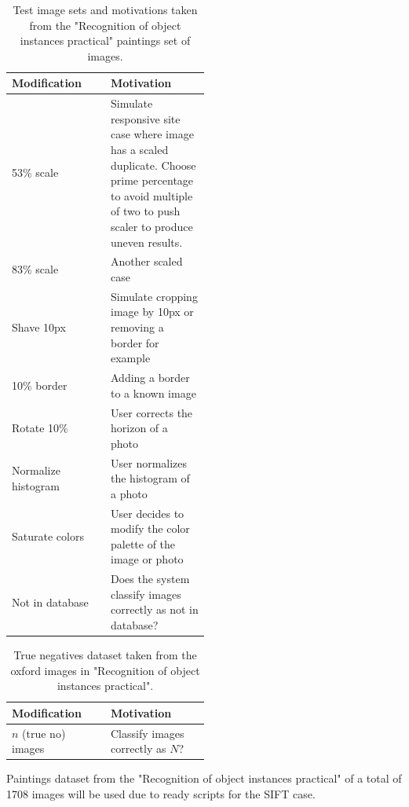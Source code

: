 \documentclass[english,12pt,a4paper,pdftex,elec,utf8]{aaltothesis}
\begin{document}
\def\arraystretch{1.5}
\begin{table}[htb]
\caption{Test image sets and motivations taken from the "Recognition of object instances practical" paintings set of images.}
\label{modifiedimages}
\begin{center}
\begin{tabular}{lp{0.5\linewidth}}
  Modification & Motivation \\
  \hline \hline
  53\% scale& Simulate responsive site case where image has a scaled duplicate. Choose prime percentage to avoid multiple of two to push scaler to produce uneven results.\\
  \hline
  83\% scale& Another scaled case \\
  \hline
  Shave 10px & Simulate cropping image by 10px or removing a border for example\\
  \hline
  10\% border & Adding a border to a known image \\
  \hline
  Rotate 10\% & User corrects the horizon of a photo \\
  \hline
  Normalize histogram & User normalizes the histogram of a photo\\
  \hline
  Saturate colors & User decides to modify the color palette of the image or photo\\
  \hline
  Not in database & Does the system classify images correctly as not in database?\\
\end{tabular}
\end{center}\end{table}

\def\arraystretch{1.5}
\begin{table}[htb]
\caption{True negatives dataset taken from the oxford images in "Recognition of object instances practical".}
\label{truenegatives}
\begin{center}
\begin{tabular}{lp{0.5\linewidth}}
  Modification & Motivation \\
  \hline \hline
  $n$ (true no) images  & Classify images correctly as $N$?\\
\end{tabular}
\end{center}\end{table}

Paintings dataset from the "Recognition of object instances practical" \cite{Vedaldi2012} of a total of 1708 images will be used due to ready scripts for the SIFT case.
\end{document}
